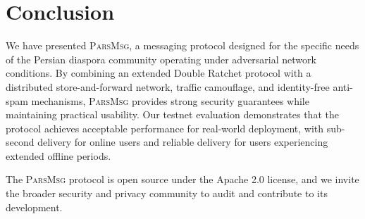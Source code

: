 \documentclass[11pt,a4paper]{article}
\newcommand{\protname}{\textsc{ParsMsg}\xspace}
\begin{document}
\section{Conclusion}

We have presented \protname, a messaging protocol designed for the specific needs of the Persian diaspora community operating under adversarial network conditions. By combining an extended Double Ratchet protocol with a distributed store-and-forward network, traffic camouflage, and identity-free anti-spam mechanisms, \protname provides strong security guarantees while maintaining practical usability. Our testnet evaluation demonstrates that the protocol achieves acceptable performance for real-world deployment, with sub-second delivery for online users and reliable delivery for users experiencing extended offline periods.

The \protname protocol is open source under the Apache 2.0 license, and we invite the broader security and privacy community to audit and contribute to its development.


\end{document}
